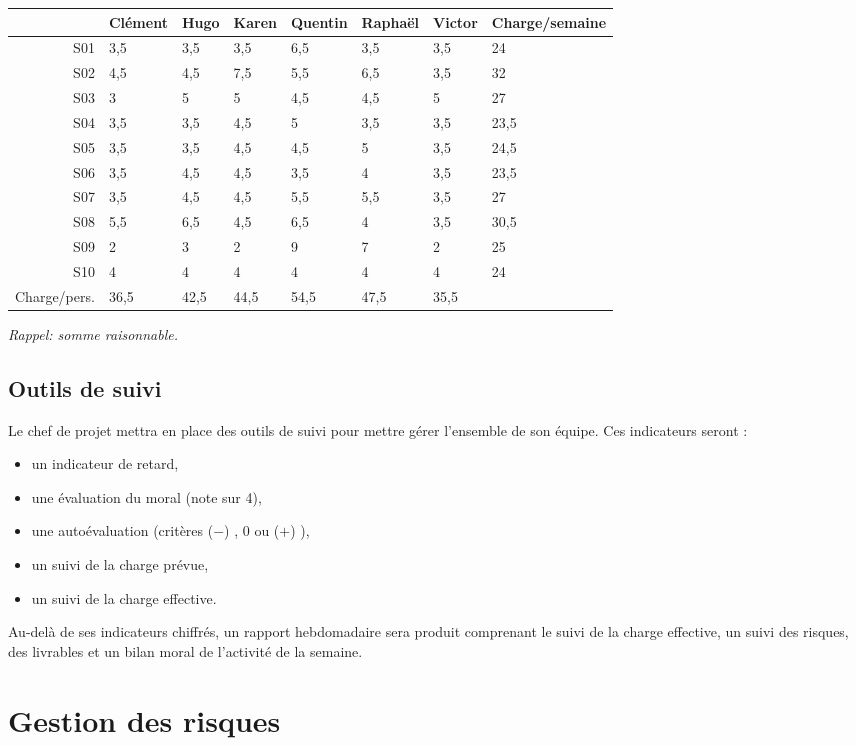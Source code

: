 \documentclass[twoside]{article}
\begin{document}
\begin{longtable}{|r|l|l|l|l|l|l|l|}
\hline
&Clément&Hugo&Karen&Quentin&Raphaël&Victor&Charge/semaine\\
\endhead \hline
S01&3,5&3,5&3,5&6,5&3,5&3,5&24\\
\hline
S02&4,5&4,5&7,5&5,5&6,5&3,5&32\\
\hline
S03&3&5&5&4,5&4,5&5&27\\
\hline
S04&3,5&3,5&4,5&5&3,5&3,5&23,5\\
\hline
S05&3,5&3,5&4,5&4,5&5&3,5&24,5\\
\hline
S06&3,5&4,5&4,5&3,5&4&3,5&23,5\\
\hline
S07&3,5&4,5&4,5&5,5&5,5&3,5&27\\
\hline
S08&5,5&6,5&4,5&6,5&4&3,5&30,5\\
\hline
S09&2&3&2&9&7&2&25\\
\hline
S10&4&4&4&4&4&4&24\\
\hline
Charge/pers.&36,5&42,5&44,5&54,5&47,5&35,5&\\
\hline
\end{longtable}

\textsl{Rappel: somme raisonnable.}

\subsection{Outils de suivi}

Le chef de projet mettra en place des outils de suivi pour mettre
gérer l'ensemble de son équipe. 
Ces indicateurs seront : 
\begin{itemize}
\item un indicateur de retard,
\item une évaluation du moral (note sur 4),
\item une autoévaluation (critères ($-$) , 0 ou ($+$) ),
\item un suivi de la charge prévue,
\item un suivi de la charge effective.
\end{itemize}

Au-delà de ses indicateurs chiffrés, un rapport hebdomadaire sera produit
comprenant le suivi de la charge effective, un suivi des risques, des
livrables et un bilan moral de l'activité de la semaine.


\section{Gestion des risques}
\end{document}
